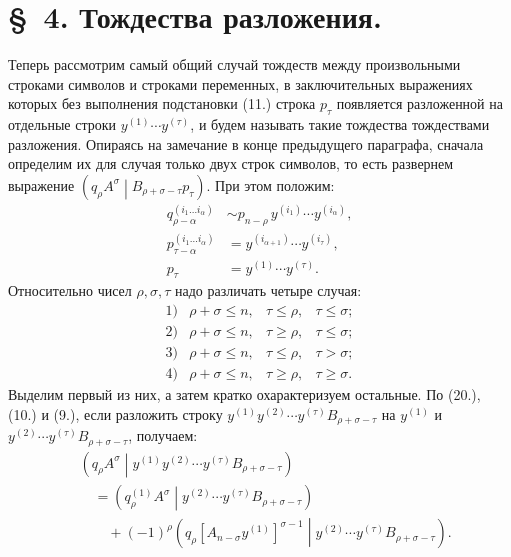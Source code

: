 \documentclass[11pt]{article}
\newcommand{\pair}[2]{\left(#1\middle|#2\right)}
\begin{document}
\section*{\S\ 4. Тождества разложения.}

Теперь рассмотрим самый общий случай тождеств между произвольными строками символов и строками переменных, в заключительных выражениях которых без выполнения подстановки (11.) строка $p_\tau$ появляется разложенной на отдельные строки $y^{(1)}\cdots y^{(\tau)}$, и будем называть такие тождества тождествами разложения. Опираясь на замечание в конце предыдущего параграфа, сначала определим их для случая только двух строк символов, то есть развернем выражение $\pair{q_\rho A^\sigma}{B_{\rho+\sigma-\tau}p_\tau}$. При этом положим:
\begin{equation}
\begin{aligned}
q_{\rho-\alpha}^{(i_1\ldots i_\alpha)}
&\sim p_{n-\rho}\,y^{(i_1)}\cdots y^{(i_\alpha)},\\
p_{\tau-\alpha}^{(i_1\ldots i_\alpha)}
&=y^{(i_{\alpha+1})}\cdots y^{(i_\tau)},\\
p_\tau&=y^{(1)}\cdots y^{(\tau)}.
\end{aligned}
\tag{22}
\end{equation}
Относительно чисел $\rho,\sigma,\tau$ надо различать четыре случая:
\[
\begin{array}{llll}
1)&\rho+\sigma\le n,& \tau\le\rho,& \tau\le\sigma;\\[2pt]
2)&\rho+\sigma\le n,& \tau\ge\rho,& \tau\le\sigma;\\[2pt]
3)&\rho+\sigma\le n,& \tau\le\rho,& \tau>\sigma;\\[2pt]
4)&\rho+\sigma\le n,& \tau\ge\rho,& \tau\ge\sigma.
\end{array}
\]
Выделим первый из них, а затем кратко охарактеризуем остальные. По (20.), (10.) и (9.), если разложить строку $y^{(1)}y^{(2)}\cdots y^{(\tau)}B_{\rho+\sigma-\tau}$ на $y^{(1)}$ и $y^{(2)}\cdots y^{(\tau)}B_{\rho+\sigma-\tau}$, получаем:
\begin{equation}
\begin{aligned}
&\pair{q_\rho A^\sigma}{y^{(1)}y^{(2)}\cdots y^{(\tau)}
B_{\rho+\sigma-\tau}}\\
&\quad=\pair{q_\rho^{(1)}A^\sigma}
{y^{(2)}\cdots y^{(\tau)}B_{\rho+\sigma-\tau}}\\
&\qquad+(-1)^\rho
\pair{q_\rho[A_{n-\sigma}y^{(1)}]^{\sigma-1}}
{y^{(2)}\cdots y^{(\tau)}B_{\rho+\sigma-\tau}}.
\end{aligned}
\tag{23}
\end{equation}
\end{document}
